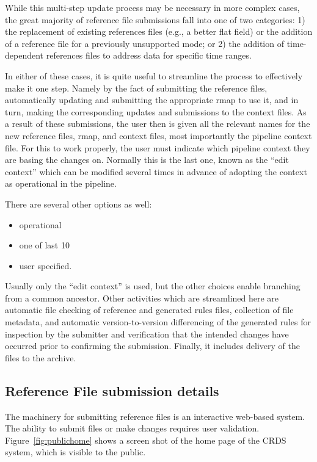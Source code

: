 \documentclass[final,authoryear,5p,times,twocolumn]{elsarticle}
\begin{document}
While this multi-step update process may be necessary in more complex cases, the
great majority of reference file submissions fall into one of two categories:
1) the replacement of existing references files (e.g., a better flat field) or
the addition of a reference file for a previously unsupported mode; or 2) the
addition of time-dependent references files to address data for specific time
ranges.

In either of these cases, it is quite useful to streamline the process to
effectively make it one step. Namely by the fact of submitting the reference
files, automatically updating and submitting the appropriate rmap to use it,
and in turn, making the corresponding updates and submissions to the context
files. As a result of these submissions, the user then is given all the
relevant names for the new reference files, rmap, and context files, most
importantly the pipeline context file. For this to work properly, the user must
indicate which pipeline context they are basing the changes on. Normally this
is the last one,  known as the ``edit context'' which can be modified several
times in advance of adopting the context as operational in the pipeline.  

There are several other options as well: 

\begin{itemize}
\item operational
\item one of last 10
\item user specified.  
\end{itemize}

Usually only the ``edit context'' is used, but the other choices
enable branching from a common ancestor.  Other activities which are
streamlined here are automatic file checking of reference and generated rules
files, collection of file metadata, and automatic version-to-version
differencing of the generated rules for inspection by the submitter and
verification that the intended changes have occurred prior to confirming
the submission.  Finally, it includes delivery of the files to the archive.

\subsection{Reference File submission details}

The machinery for submitting reference files is an interactive web-based
system. The ability to submit files or make changes requires user
validation. Figure~\ref{fig:publichome} 
shows a screen shot of the home page of the CRDS
system, which is visible to the public. 
\end{document}
